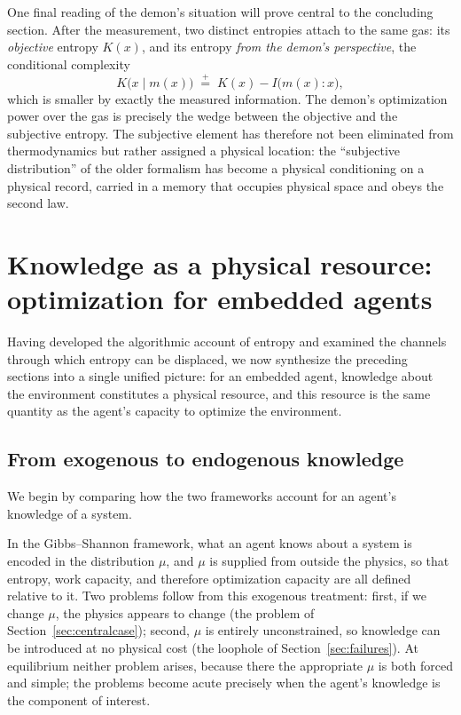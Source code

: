 \documentclass[10pt]{article}
\theoremstyle{definition}
\theoremstyle{remark}
\newcommand{\peq}{\mathrel{\stackrel{+}{=}}}
\begin{document}
One final reading of the demon's situation will prove central to the concluding section. After the measurement, two distinct entropies attach to the same gas: its \emph{objective} entropy $K(x)$, and its entropy \emph{from the demon's perspective}, the conditional complexity
\[
K\big(x \mid m(x)\big) \;\peq\; K(x) - I\big(m(x) : x\big),
\]
which is smaller by exactly the measured information. The demon's optimization power over the gas is precisely the wedge between the objective and the subjective entropy. The subjective element has therefore not been eliminated from thermodynamics but rather assigned a physical location: the ``subjective distribution'' of the older formalism has become a physical conditioning on a physical record, carried in a memory that occupies physical space and obeys the second law.
\section{Knowledge as a physical resource: optimization for embedded agents}
\label{sec:embedded}

Having developed the algorithmic account of entropy and examined the channels through which entropy can be displaced, we now synthesize the preceding sections into a single unified picture: for an embedded agent, knowledge about the environment constitutes a physical resource, and this resource is the same quantity as the agent's capacity to optimize the environment.

\subsection{From exogenous to endogenous knowledge}
\label{sec:endogenous}

We begin by comparing how the two frameworks account for an agent's knowledge of a system.

In the Gibbs--Shannon framework, what an agent knows about a system is encoded in the distribution $\mu$, and $\mu$ is supplied from outside the physics, so that entropy, work capacity, and therefore optimization capacity are all defined relative to it. Two problems follow from this exogenous treatment: first, if we change $\mu$, the physics appears to change (the problem of Section~\ref{sec:centralcase}); second, $\mu$ is entirely unconstrained, so knowledge can be introduced at no physical cost (the loophole of Section~\ref{sec:failures}). At equilibrium neither problem arises, because there the appropriate $\mu$ is both forced and simple; the problems become acute precisely when the agent's knowledge is the component of interest.
\end{document}
